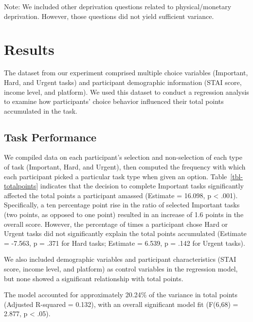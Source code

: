 \documentclass[
]{report}
\begin{document}
Note: We included other deprivation questions related to
physical/monetary deprivation. However, those questions did not yield
sufficient variance.

\hypertarget{results}{%
\section{Results}\label{results}}

The dataset from our experiment comprised multiple choice variables
(Important, Hard, and Urgent tasks) and participant demographic
information (STAI score, income level, and platform). We used this
dataset to conduct a regression analysis to examine how participants'
choice behavior influenced their total points accumulated in the task.

\hypertarget{task-performance}{%
\subsection{Task Performance}\label{task-performance}}

We compiled data on each participant's selection and non-selection of
each type of task (Important, Hard, and Urgent), then computed the
frequency with which each participant picked a particular task type when
given an option. Table~\ref{tbl-totalpoints} indicates that the decision
to complete Important tasks significantly affected the total points a
participant amassed (Estimate = 16.098, p \textless{} .001).
Specifically, a ten percentage point rise in the ratio of selected
Important tasks (two points, as opposed to one point) resulted in an
increase of 1.6 points in the overall score. However, the percentage of
times a participant chose Hard or Urgent tasks did not significantly
explain the total points accumulated (Estimate = -7.563, p = .371 for
Hard tasks; Estimate = 6.539, p = .142 for Urgent tasks).

We also included demographic variables and participant characteristics
(STAI score, income level, and platform) as control variables in the
regression model, but none showed a significant relationship with total
points.

The model accounted for approximately 20.24\% of the variance in total
points (Adjusted R-squared = 0.132), with an overall significant model
fit (F(6,68) = 2.877, p \textless{} .05).
\end{document}
